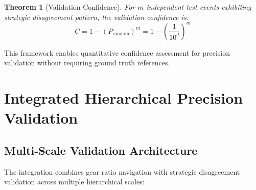\documentclass[12pt,a4paper]{article}
\newtheorem{theorem}{Theorem}
\begin{document}
\begin{theorem}[Validation Confidence]
For $m$ independent test events exhibiting strategic disagreement pattern, the validation confidence is:
$$C = 1 - \left(P_{\text{random}}\right)^m = 1 - \left(\frac{1}{10^d}\right)^m$$
\end{theorem}

This framework enables quantitative confidence assessment for precision validation without requiring ground truth references.

\section{Integrated Hierarchical Precision Validation}

\subsection{Multi-Scale Validation Architecture}

The integration combines gear ratio navigation with strategic disagreement validation across multiple hierarchical scales:
\end{document}
